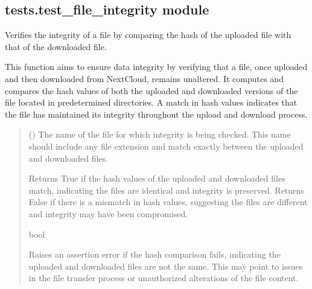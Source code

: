 \documentclass[letterpaper,10pt,english]{sphinxmanual}
\begin{document}
\subsection{tests.test\_file\_integrity module}
\label{\detokenize{tests:module-tests.test_file_integrity}}\label{\detokenize{tests:tests-test-file-integrity-module}}

\begin{fulllineitems}
\label{\detokenize{tests:tests.test_file_integrity.file_integrity}}
\pysigstartsignatures
{}
\pysigstopsignatures
\sphinxAtStartPar
Verifies the integrity of a file by comparing the hash of the uploaded file with that of the downloaded file.

\sphinxAtStartPar
This function aims to ensure data integrity by verifying that a file, once uploaded and then downloaded from
NextCloud, remains unaltered. It computes and compares the hash values of both the uploaded and downloaded
versions of the file located in predetermined directories. A match in hash values indicates that the file has
maintained its integrity throughout the upload and download process.
\begin{quote}\begin{description}
\sphinxAtStartPar
{} () \textendash{} The name of the file for which integrity is being checked. This name should include any
file extension and match exactly between the uploaded and downloaded files.

\sphinxAtStartPar
Returns True if the hash values of the uploaded and downloaded files match, indicating the files are
identical and integrity is preserved. Returns False if there is a mismatch in hash values, suggesting
the files are different and integrity may have been compromised.

\sphinxAtStartPar
bool

\sphinxAtStartPar
{} \textendash{} Raises an assertion error if the hash comparison fails, indicating the uploaded and
downloaded files are not the same. This may point to issues in the file transfer process
or unauthorized alterations of the file content.


\end{description}
\end{quote}
\end{fulllineitems}
\end{document}
